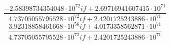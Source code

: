 $$\frac{- 2.58398734354048 \cdot 10^{72} i f + 2.69716941607415 \cdot 10^{71}}{4.73705055795528 \cdot 10^{72} i f + 2.4201725243886 \cdot 10^{71}}$$
$$\frac{3.92318858461668 \cdot 10^{56} i f + 4.0173358562871 \cdot 10^{71}}{4.73705055795528 \cdot 10^{72} i f + 2.4201725243886 \cdot 10^{71}}$$
